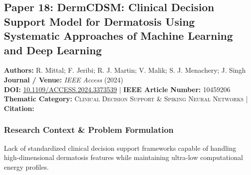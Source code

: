 \subsection{Paper 18: DermCDSM: Clinical Decision Support Model for Dermatosis Using Systematic Approaches of Machine Learning and Deep Learning}
\label{sec:paper_18}

\begin{tcolorbox}[colback=gray!5!white,colframe=gray!75!black,title=\textbf{Metadata \& Citation Summary}]
\textbf{Authors:} R. Mittal; F. Jeribi; R. J. Martin; V. Malik; S. J. Menachery; J. Singh \\
\textbf{Journal / Venue:} \textit{IEEE Access} (2024) \\
\textbf{DOI:} \href{https://doi.org/10.1109/ACCESS.2024.3373539}{10.1109/ACCESS.2024.3373539} \quad | \quad \textbf{IEEE Article Number:} 10459206 \\
\textbf{Thematic Category:} \textsc{Clinical Decision Support \& Spiking Neural Networks} \quad | \quad \textbf{Citation:} \cite{10459206}
\end{tcolorbox}

\subsubsection*{Research Context \& Problem Formulation}
Lack of standardized clinical decision support frameworks capable of handling high-dimensional dermatosis features while maintaining ultra-low computational energy profiles.

